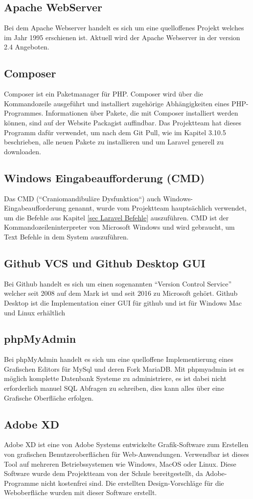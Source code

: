 \subsection{Apache WebServer}
Bei dem Apache Webserver handelt es sich um eine quelloffenes Projekt welches im Jahr 1995 erschienen ist. Aktuell wird der Apache Webserver in der version 2.4 Angeboten.
\subsection{Composer}
Composer ist ein Paketmanager für PHP. Composer wird über die Kommandozeile ausgeführt und installiert zugehörige Abhängigkeiten eines PHP-Programmes. Informationen über Pakete, die mit Composer installiert werden können, sind auf der Website Packagist auffindbar. Das Projektteam hat dieses Programm dafür verwendet, um nach dem Git Pull, wie im Kapitel 3.10.5 beschrieben, alle neuen Pakete zu installieren und um Laravel generell zu downloaden.
\subsection{Windows Eingabeaufforderung (CMD)}
Das CMD (“Craniomandibuläre Dysfunktion“) auch Windows-Eingabeaufforderung genannt, wurde vom Projektteam hauptsächlich verwendet, um die Befehle aus Kapitel \ref{sec Laravel Befehle} auszuführen. CMD ist der Kommandozeileninterpreter von Microsoft Windows und wird gebraucht, um Text Befehle in dem System auszuführen. 
\subsection{Github VCS und Github Desktop GUI}
Bei Github handelt es sich um einen sogenannten “Version Control Service” welcher seit 2008 auf dem Mark ist und seit 2016 zu Microsoft gehört. Github Desktop ist die Implementation einer GUI für github und ist für Windows Mac und Linux erhältlich

\newpage
\subsection{ phpMyAdmin}
Bei phpMyAdmin handelt es sich um eine quelloffene Implementierung eines Grafischen Editors für MySql und deren Fork MariaDB. Mit phpmyadmin ist es möglich komplette Datenbank Systeme zu administriere, es ist dabei nicht erforderlich manuel SQL Abfragen zu schreiben, dies kann alles über eine Grafische Oberfläche erfolgen.  
\subsection{Adobe XD}
Adobe XD ist eine von Adobe Systems entwickelte Grafik-Software zum Erstellen von grafischen Benutzeroberflächen für Web-Anwendungen. Verwendbar ist dieses Tool auf mehreren Betriebssystemen wie Windows, MacOS oder Linux. Diese Software wurde dem Projektteam von der Schule bereitgestellt, da Adobe-Programme nicht kostenfrei sind. Die erstellten Design-Vorschläge für die Weboberfläche wurden mit dieser Software erstellt. 


